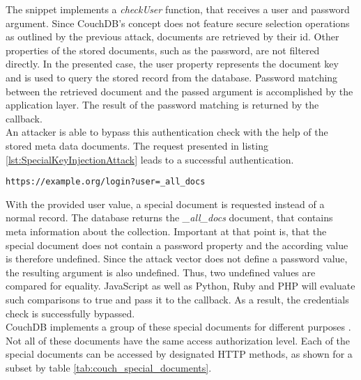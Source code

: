 The snippet implements a \emph{checkUser} function, that receives a user and password argument. Since CouchDB's concept does not feature secure selection operations as outlined by the previous attack, documents are retrieved by their id. Other properties of the stored documents, such as the password, are not filtered directly. In the presented case, the user property represents the document key and is used to query the stored record from the database. Password matching between the retrieved document and the passed argument is accomplished by the application layer. The result of the password matching is returned by the callback. \\

An attacker is able to bypass this authentication check with the help of the stored meta data documents. The request presented in listing \ref{lst:SpecialKeyInjectionAttack} leads to a successful authentication.
 
\begin{lstlisting}[caption={Attack vector against CouchDB for speical key injection via the query-string parameter}, label={lst:SpecialKeyInjectionAttack}]
https://example.org/login?user=_all_docs
\end{lstlisting}

With the provided user value, a special document is requested instead of a normal record. The database returns the \emph{\_all\_docs} document, that contains meta information about the collection. Important at that point is, that the special document does not contain a password property and the according value is therefore undefined. Since the attack vector does not define a password value, the resulting argument is also undefined. Thus, two undefined values are compared for equality. JavaScript as well as Python, Ruby and PHP will evaluate such comparisons to true and pass it to the callback. As a result, the credentials check is successfully bypassed.\\

CouchDB implements a group of these special documents for different purposes \cite{ASF2016}. Not all of these documents have the same access authorization level. Each of the special documents can be accessed by designated HTTP methods, as shown for a subset by table \ref{tab:couch_special_documents}. \\

